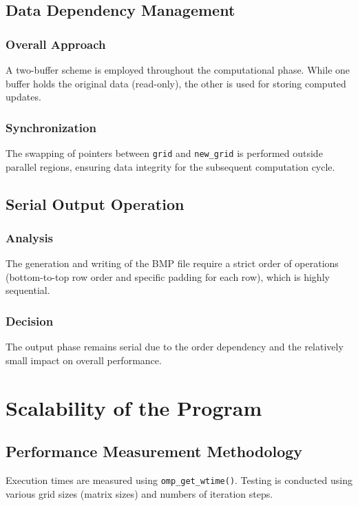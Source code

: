 \documentclass[12pt]{article}
\begin{document}
\newpage
\subsection{Data Dependency Management}

\subsubsection{Overall Approach}
A two-buffer scheme is employed throughout the computational phase. While one buffer holds the original data (read-only), the other is used for storing computed updates.

\subsubsection{Synchronization}
The swapping of pointers between \texttt{grid} and \texttt{new\_grid} is performed outside parallel regions, ensuring data integrity for the subsequent computation cycle.

\subsection{Serial Output Operation}

\subsubsection{Analysis}
The generation and writing of the BMP file require a strict order of operations (bottom-to-top row order and specific padding for each row), which is highly sequential.

\subsubsection{Decision}
The output phase remains serial due to the order dependency and the relatively small impact on overall performance.

\newpage
\section{Scalability of the Program}

\subsection{Performance Measurement Methodology}

Execution times are measured using \texttt{omp\_get\_wtime()}.
Testing is conducted using various grid sizes (matrix sizes) and numbers of iteration steps.
\end{document}
